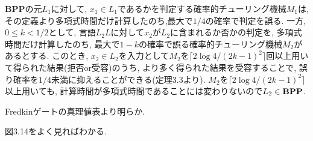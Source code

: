\begin{ex}
    \label{ex3.23}
\end{ex}

\begin{ex}
    \label{ex3.24}
\end{ex}

\begin{ex}
    \label{ex3.25}
\end{ex}

\begin{ex}
    \label{ex3.26}
\end{ex}

\begin{ex}
    \label{ex3.27}
\end{ex}

\begin{ex}
    \label{ex3.28}
    {\bf BPP}の元$L_1$に対して, $x_1 \in L_1$であるかを判定する確率的チューリング機械$M_1$は, その定義より多項式時間だけ計算したのち,最大で$1/4$の確率で判定を誤る.
    一方, $0 \leq k < 1/2$として, 言語$L_2L$に対して$x_2$が$L_2$に含まれるか否かの判定を, 多項式時間だけ計算したのち, 最大で$1-k$の確率で誤る確率的チューリング機械$M_2$があるとする. このとき, $x_2 \in L_2$を入力として$M_2$を$\lceil 2 \log 4 / (2k-1)^2 \rceil$回以上用いて得られた結果(拒否or受容)のうち, より多く得られた結果を受容することで, 誤り確率を$1/4$未満に抑えることができる(定理3.3より). $M_2$を$\lceil 2 \log 4 / (2k-1)^2 \rceil$以上用いても, 計算時間が多項式時間であることには変わりないので$L_2 \in {\bf BPP}$.

\end{ex}

\begin{ex}
    \label{ex3.29}
    Fredkinゲートの真理値表より明らか.
\end{ex}

\begin{ex}
    \label{ex3.30}
    図3.14をよく見ればわかる.
\end{ex}

\begin{ex}
    \label{ex3.31}
\end{ex}

\begin{ex}
    \label{ex3.32}
\end{ex}
